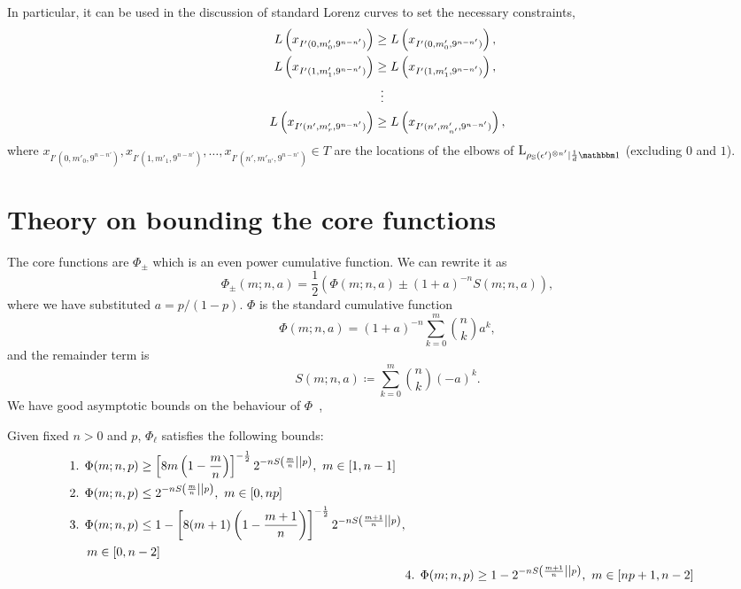 In particular, it can be used in the discussion of standard Lorenz curves to set the necessary constraints,
\begin{align}
L\left(x_{I'(0, m'_{0}, 9^{n-n'})}\right) &\geq L\left(x_{I'(0, m'_{0}, 9^{n-n'})}\right), \nonumber\\
L\left(x_{I'(1, m'_{1}, 9^{n-n'})}\right) &\geq L\left(x_{I'(1, m'_{1}, 9^{n-n'})}\right), \nonumber\\
&\vdotswithin{=} \nonumber\\
L\left(x_{I'(n', m'_{r}, 9^{n-n'})}\right) &\geq L\left(x_{I'(n', m'_{n'}, 9^{n-n'})}\right), \nonumber
\end{align}
where $x_{I'(0, m'_{0}, 9^{n - n'})}, x_{I'(1, m'_{1}, 9^{n - n'})}, \dots, x_{I'(n', m'_{n'}, 9^{n - n'})} \in T$ are the locations of the elbows of $\lc{\rho_{\rm{S}}(\epsilon')^{\otimes n'}}{\frac{1}{d}\id}$ (excluding $0$ and $1$).

\section{Theory on bounding the core functions}
The core functions are $\Phi_{\pm}$ which is an even power cumulative function. 
We can rewrite it as
\begin{equation}
\Phi_{\pm}(m; n, a) = \frac{1}{2}( \Phi(m; n, a) \pm (1+a)^{-n} S(m; n, a) ),
\end{equation}
where we have substituted $a = p/(1-p)$. 
$\Phi$ is the standard cumulative function 
\begin{equation}
	\Phi(m; n, a) = (1+a)^{-n} \sum_{k=0}^m \binom{n}{k} a^k,
\end{equation}
and the remainder term is
\begin{equation}
S(m; n, a) \coloneqq \sum_{k=0}^m \binom{n}{k} (-a)^k.
\end{equation}
We have good asymptotic bounds on the behaviour of $\Phi$~\cite{cit:ash},
\begin{lemma}\label{lem:phil_bounds}
	Given fixed $n>0$ and $p$, $\Phi_\ell$ satisfies the following bounds:
	\begin{align*}
		\begin{split}
		&\text{1. } \Phi(m; n, p) \geq \left[ 8m\left(1-\frac{m}{n}\right) \right]^{-\frac{1}{2}} 2^{-n{S\left( \frac{m}{n} \middle\vert\middle\vert p \right)}},\ m\in [1,n-1] \\
		&\text{2. } \Phi(m; n, p) \leq 2^{-n{S\left( \frac{m}{n} \middle\vert\middle\vert p \right)}},\ m\in [0,np] \\
		&\text{3. } \Phi(m; n, p) \leq 1 - \left[ 8(m+1)\left(1-\frac{m+1}{n}\right) \right]^{-\frac{1}{2}} 2^{-nS\left( \frac{m+1}{n} \middle\vert\middle\vert p \right)}, \\
		&\hspace{14pt} m\in [0,n-2]
		\end{split}
		\\
		&\text{4. } \Phi(m; n, p) \geq 1 - 2^{-nS\left( \frac{m+1}{n} \middle\vert\middle\vert p \right)},\ m\in [np+1,n-2]
	\end{align*}
\end{lemma}


